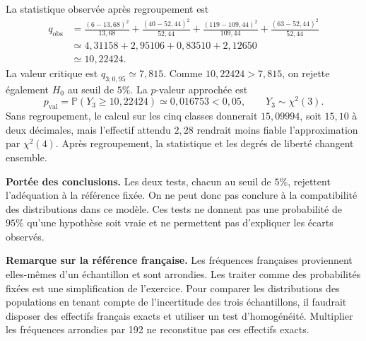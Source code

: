 {{\begin{minipage}{\linewidth}
La statistique observée après regroupement est
\begin{align*}
q_{\mathrm{obs}}
&=\frac{(6-13{,}68)^2}{13{,}68}
 +\frac{(40-52{,}44)^2}{52{,}44}
 +\frac{(119-109{,}44)^2}{109{,}44}
 +\frac{(63-52{,}44)^2}{52{,}44}\\
&\simeq4{,}31158+2{,}95106+0{,}83510+2{,}12650\\
&\simeq10{,}22424.
\end{align*}
La valeur critique est $q_{3;0{,}95}\simeq7{,}815$. Comme $10{,}22424>7{,}815$, on rejette également $H_0$ au seuil de $5\%$. La $p$-valeur approchée est
\[
p_{\mathrm{val}}=\mathbb P(Y_3\geq10{,}22424)\simeq0{,}016753<0{,}05,
\qquad Y_3\sim\chi^2(3).
\]
Sans regroupement, le calcul sur les cinq classes donnerait $15{,}09994$, soit $15{,}10$ à deux décimales, mais l'effectif attendu $2{,}28$ rendrait moins fiable l'approximation par $\chi^2(4)$. Après regroupement, la statistique et les degrés de liberté changent ensemble.
\end{minipage}

\begin{minipage}{\linewidth}
\textbf{Portée des conclusions.} Les deux tests, chacun au seuil de $5\%$, rejettent l'adéquation à la référence fixée. On ne peut donc pas conclure à la compatibilité des distributions dans ce modèle. Ces tests ne donnent pas une probabilité de $95\%$ qu'une hypothèse soit vraie et ne permettent pas d'expliquer les écarts observés.

\textbf{Remarque sur la référence française.} Les fréquences françaises proviennent elles-mêmes d'un échantillon et sont arrondies. Les traiter comme des probabilités fixées est une simplification de l'exercice. Pour comparer les distributions des populations en tenant compte de l'incertitude des trois échantillons, il faudrait disposer des effectifs français exacts et utiliser un test d'homogénéité. Multiplier les fréquences arrondies par 192 ne reconstitue pas ces effectifs exacts.
\end{minipage}
}
}
